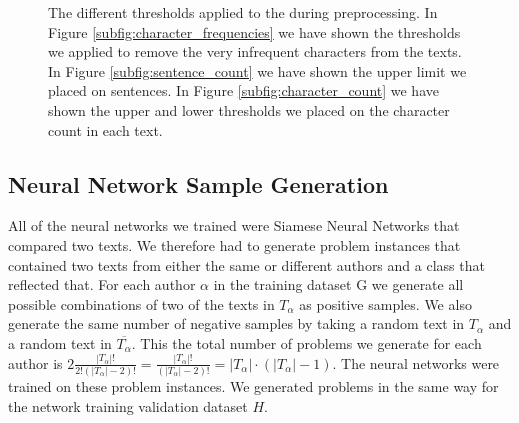 \begin{figure}[htb]
\begin{minipage}{.5\linewidth}
{        }
    \end{minipage}\par\medskip
    \centering

    \caption{The different thresholds applied to the during preprocessing. In
        Figure \ref{subfig:character_frequencies} we have shown the thresholds
        we applied to remove the very infrequent characters from the texts. In
        Figure \ref{subfig:sentence_count} we have shown the upper limit we
        placed on sentences. In Figure \ref{subfig:character_count} we have
        shown the upper and lower thresholds we placed on the character count in
        each text.
    }
    \label{fig:cutoff_thresholds}
\end{figure}


\subsection{Neural Network Sample Generation}

All of the neural networks we trained were Siamese Neural Networks that
compared two texts. We therefore had to generate problem instances that
contained two texts from either the same or different authors and a class
that reflected that. For each author $\alpha$ in the training dataset \gls{G}
we generate all possible combinations of two of the texts in $T_\alpha$ as
positive samples. We also generate the same number of negative samples by
taking a random text in $T_\alpha$ and a random text in $\overline{T_\alpha}$.
This the total number of problems we generate for each
author is $2\frac{\left|T_\alpha\right|!}{2!(\left|T_\alpha\right|-2)!}
= \frac{\left|T_\alpha\right|!}{(\left|T_\alpha\right|-2)!} =
\left|T_\alpha\right| \cdot (\left|T_\alpha\right| - 1) $. The neural
networks were trained on these problem instances. We generated problems in the
same way for the network training validation dataset $H$.
